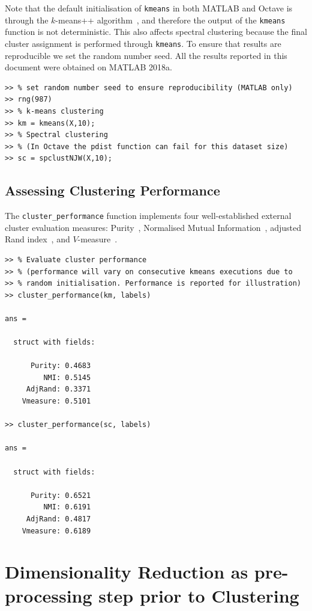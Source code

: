 \documentclass{book}
\begin{document}
Note that the default initialisation of {\tt kmeans} in both MATLAB and 
Octave is through the $k$-means++ algorithm~\cite{ArthurV2007}, and therefore
the output of the {\tt kmeans} function is not deterministic. This also affects
spectral clustering because the final cluster assignment is performed through
{\tt kmeans}. To ensure that results are reproducible we set the random number
seed.
%
All the results reported in this document were obtained on MATLAB 2018a.

\begin{verbatim}
>> % set random number seed to ensure reproducibility (MATLAB only)
>> rng(987)
>> % k-means clustering
>> km = kmeans(X,10);
>> % Spectral clustering
>> % (In Octave the pdist function can fail for this dataset size)
>> sc = spclustNJW(X,10);
\end{verbatim}

\subsection{Assessing Clustering Performance}

The {\tt cluster\_performance} function implements four well-established
external cluster evaluation measures: Purity~\cite{ZhaoK2004}, Normalised
Mutual Information~\cite{StrehlG2002}, adjusted Rand
index~\cite{Hubert1985}, and $V$-measure~\cite{Rosenberg2007}.


\begin{verbatim}
>> % Evaluate cluster performance
>> % (performance will vary on consecutive kmeans executions due to
>> % random initialisation. Performance is reported for illustration) 
>> cluster_performance(km, labels)

ans = 

  struct with fields:

      Purity: 0.4683
         NMI: 0.5145
     AdjRand: 0.3371
    Vmeasure: 0.5101

>> cluster_performance(sc, labels)

ans = 

  struct with fields:

      Purity: 0.6521
         NMI: 0.6191
     AdjRand: 0.4817
    Vmeasure: 0.6189

\end{verbatim}



\section{Dimensionality Reduction as pre-processing step prior to Clustering}
\end{document}
